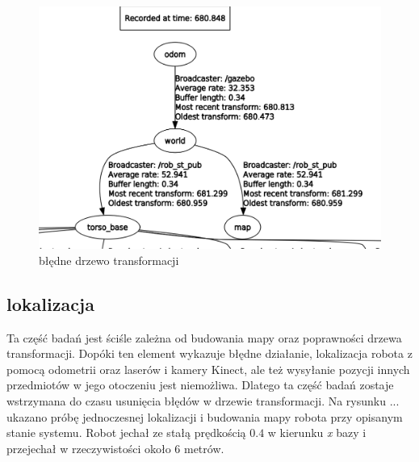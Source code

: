 		\begin{figure}
			\centering
			\includegraphics[width=\linewidth]{imgs/wstepne_badania/tf.png}
			\caption{błędne drzewo transformacji}
			\label{fig:tf}
		\end{figure}
		
		
	
	\subsection{lokalizacja}
	
		Ta część badań jest ściśle zależna od budowania mapy oraz poprawności drzewa transformacji.
		Dopóki ten element wykazuje błędne działanie, lokalizacja robota z pomocą odometrii oraz laserów i kamery Kinect, ale też wysyłanie pozycji innych przedmiotów w jego otoczeniu jest niemożliwa.
		Dlatego ta część badań zostaje wstrzymana do czasu usunięcia błędów w drzewie transformacji. 
		Na rysunku ... ukazano próbę jednoczesnej lokalizacji i budowania mapy robota przy opisanym stanie systemu. 
		Robot jechał ze stałą prędkością $0.4$ w kierunku \textit{x} bazy i przejechał w rzeczywistości około $6$ metrów.
		
